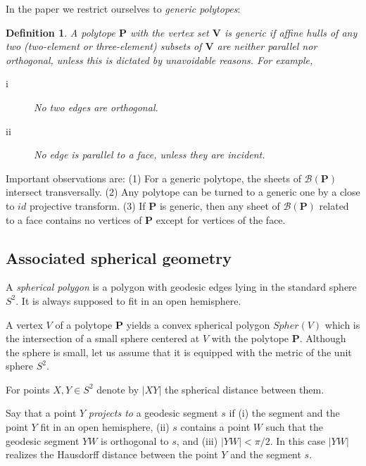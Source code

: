 \documentclass[12pt]{amsart}
\newtheorem*{main lemma}{The main lemma}
\newtheorem{definition}{Definition}
\begin{document}
In the paper we restrict ourselves to \textit{generic  polytopes}:




\begin{definition}\label{DefGen} A polytope $\mathbf{P}$ with the vertex set $\mathbf{V}$ is generic if  affine hulls of any two (two-element or three-element) subsets of
$\mathbf{V}$ are neither parallel nor orthogonal, unless this is dictated by unavoidable reasons. For example,
  \begin{description}
  \item[i] No two edges  are orthogonal.
  \item[ii]  No edge is parallel to a face, unless they are incident. 
\end{description}
\end{definition}

Important observations are: (1) {For a generic polytope, the sheets of $\mathcal{B}(\mathbf{P})$ intersect transversally.}
(2) {Any polytope can be turned to a generic one by a close to $id$ projective transform.} (3) If $\mathbf{P}$ is generic, then any sheet of $\mathcal{B}(\mathbf{P})$ 
related to a face contains no vertices of $\mathbf{P}$ except for vertices of the face.


\medskip

\subsection{Associated spherical geometry}


A \textit{spherical polygon}  is a polygon with geodesic edges lying in the standard sphere $S^2$. It is always supposed to fit in an open hemisphere.

A vertex $V$ of a polytope $\mathbf{P}$ yields a convex spherical polygon $Spher(V)$  which is the intersection of a small sphere centered at $V$  with  the polytope $\mathbf{P}$.  Although the sphere is small, let us assume that it is equipped with the metric of the unit sphere  $S^2$.



For points $X,Y \in S^2$ denote by  $|XY|$ the spherical {distance} between them.

 Say that  a point  $Y$ \textit{projects to }a geodesic segment $s$  if (i) the segment and the point $Y$ fit in an open hemisphere, (ii) $s$ contains a point  $W$ such that the geodesic segment $YW$ is orthogonal to $s$, and (iii) $|YW|<\pi/2$.  In this case  $|YW|$ realizes the Hausdorff distance between the point  $Y$ and the segment $s$. 
\end{document}

